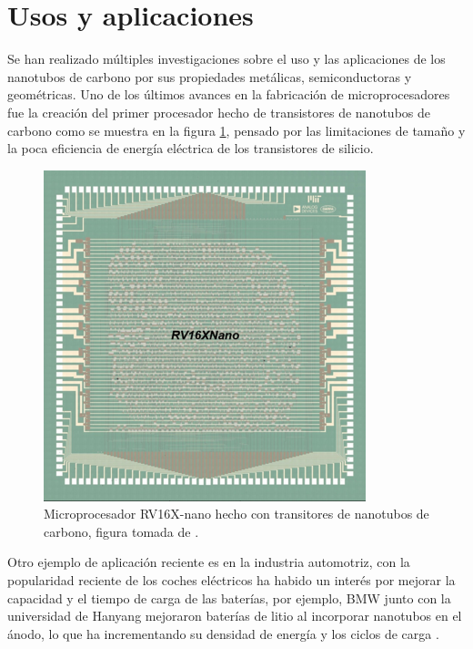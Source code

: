 \section{Usos y aplicaciones}

Se han realizado múltiples investigaciones sobre el uso y las aplicaciones de los nanotubos de carbono por sus propiedades metálicas, semiconductoras y geométricas. Uno de los últimos avances en la fabricación de microprocesadores fue la creación del primer procesador hecho de transistores de nanotubos de carbono \cite{Hills2019} como se muestra en la figura \ref{fig:rv16xnano}, pensado por las limitaciones de tamaño y la poca eficiencia de energía eléctrica de los transistores de silicio.\\

\begin{figure}[!h]
    \centering
    \includegraphics[width=.4\textwidth,keepaspectratio=true]{CNT/rv16x-nano.png}
    \caption{Microprocesador RV16X-nano hecho con transitores de nanotubos de carbono, figura tomada de \cite{Hills2019}.}
    \label{fig:rv16xnano}
\end{figure}

Otro ejemplo de aplicación reciente es en la industria automotriz, con la popularidad reciente de los coches eléctricos ha habido un interés por mejorar la capacidad y el tiempo de carga de las baterías, por ejemplo, BMW junto con la universidad de Hanyang mejoraron baterías de litio al incorporar nanotubos en el ánodo, lo que ha incrementando su densidad de energía y los ciclos de carga \cite{lee2016}.\\


